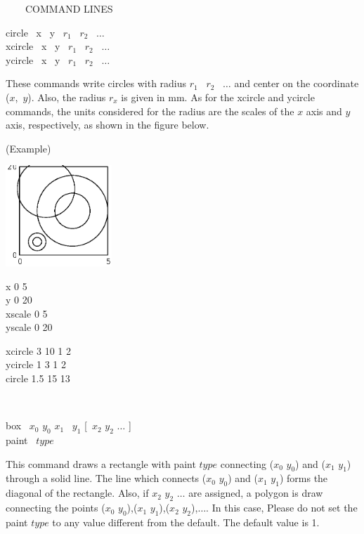 \begin{qsection}{\ ~~~COMMAND LINES}
\begin{minipage}[t]{5.5cm}
circle ~x ~y ~$r_1$ ~$r_2$ ~$\dots$\\
xcircle ~x ~y ~$r_1$ ~$r_2$ ~$\dots$\\
ycircle ~x ~y ~$r_1$ ~$r_2$ ~$\dots$

\end{minipage}
\begin{minipage}[t]{9cm}
These commands write circles with radius $r_1$ ~$r_2$ ~$\dots$
and center on the coordinate ($x$,~$y$).
Also, the radius $r_x$ is given in mm.
As for the xcircle and ycircle commands,
the units considered for the radius are the scales of the $x$ axis and
 $y$ axis, respectively, as shown in the figure below.

(Example)\\
\begin{minipage}[t]{4.3cm}
 \includegraphics[width=4cm]{fig/circle.eps}
\end{minipage}
\begin{minipage}[b]{4.5cm}
\baselineskip 5pt
x 0 5\\
y 0 20\\
xscale 0 5\\
yscale 0 20

\vspace*{3mm}
xcircle 3 10 1 2\\
ycircle 1 3 1 2\\
circle  1.5 15 13\\
\vspace*{7mm}
\end{minipage}
\end{minipage}\\

\begin{minipage}[t]{5.5cm}
box ~$x_0$ $y_0$ $x_1$ ~$y_1$ [~$x_2$ $y_2$ $\dots$ ]\\
paint ~$type$
\end{minipage}
\begin{minipage}[t]{9cm}
This command draws a rectangle with paint $type$
connecting ($x_0$ $y_0$) and ($x_1$ $y_1$) through a solid line.
The line which connects ($x_0$ $y_0$) and ($x_1$ $y_1$) forms
the diagonal of the rectangle.
Also, if $x_2$ $y_2$ $\dots$ are assigned, a polygon is draw connecting
the points ($x_0$ $y_0$),($x_1$ $y_1$),($x_2$ $y_2$),$\dots$.
In this case, Please do not set the paint $type$
 to any value different from the default.
The default value is 1.\\


\end{minipage}
\end{qsection}
